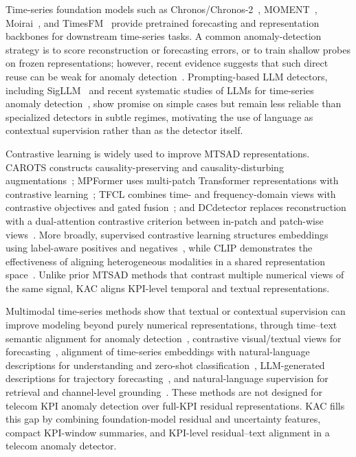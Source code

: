 \documentclass[conference]{IEEEtran}
\begin{document}
Time-series foundation models such as Chronos/Chronos-2~\cite{ansari2024chronos,ansari2025chronos2}, MOMENT~\cite{goswami2024moment}, Moirai~\cite{woo2024moirai}, and TimesFM~\cite{das2024timesfm} provide pretrained forecasting and representation backbones for downstream time-series tasks. A common anomaly-detection strategy is to score reconstruction or forecasting errors, or to train shallow probes on frozen representations; however, recent evidence suggests that such direct reuse can be weak for anomaly detection~\cite{zhu2026oneliners}. Prompting-based LLM detectors, including SigLLM~\cite{alnegheimish2024sigllm} and recent systematic studies of LLMs for time-series anomaly detection~\cite{zhou2025llmts}, show promise on simple cases but remain less reliable than specialized detectors in subtle regimes, motivating the use of language as contextual supervision rather than as the detector itself.

Contrastive learning is widely used to improve MTSAD representations. CAROTS constructs causality-preserving and causality-disturbing augmentations~\cite{kim2025carots}; MPFormer uses multi-patch Transformer representations with contrastive learning~\cite{ma2024mpformer}; TFCL combines time- and frequency-domain views with contrastive objectives and gated fusion~\cite{zhang2025tfcl}; and DCdetector replaces reconstruction with a dual-attention contrastive criterion between in-patch and patch-wise views~\cite{yang2023dcdetector}. More broadly, supervised contrastive learning structures embeddings using label-aware positives and negatives~\cite{khosla2020supervised}, while CLIP demonstrates the effectiveness of aligning heterogeneous modalities in a shared representation space~\cite{radford2021clip}. Unlike prior MTSAD methods that contrast multiple numerical views of the same signal, KAC aligns KPI-level temporal and textual representations.

Multimodal time-series methods show that textual or contextual supervision can improve modeling beyond purely numerical representations, through time--text semantic alignment for anomaly detection~\cite{hu2026mindts}, contrastive visual/textual views for forecasting~\cite{dong2025timesclip}, alignment of time-series embeddings with natural-language descriptions for understanding and zero-shot classification~\cite{chen2025tsclip}, LLM-generated descriptions for trajectory forecasting~\cite{li2025typhoformer}, and natural-language supervision for retrieval and channel-level grounding~\cite{chen2025trace}. These methods are not designed for telecom KPI anomaly detection over full-KPI residual representations. KAC fills this gap by combining foundation-model residual and uncertainty features, compact KPI-window summaries, and KPI-level residual--text alignment in a telecom anomaly detector.
\end{document}
